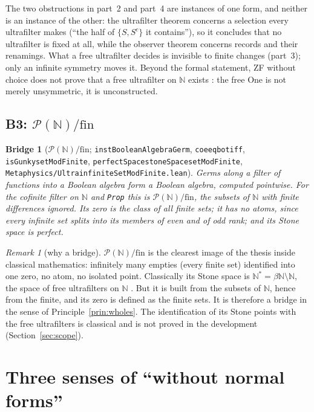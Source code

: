 \documentclass[]{article}
\newtheorem{bridge}[theorem]{Bridge}
\theoremstyle{definition}
\theoremstyle{remark}
\newtheorem{remark}[theorem]{Remark}
\newcommand{\codeus}{\textunderscore\allowbreak}
\newcommand{\code}[1]{\texttt{\let\_\codeus #1}}
\newcommand{\lpath}[1]{{\ttfamily\nolinkurl{#1}}}
\newcommand{\N}{\mathbb{N}}
\newcommand{\Nstar}{\N^{*}}
\newcommand{\Pfin}{\mathcal{P}(\N)/\mathrm{fin}}
\newcommand{\meta}[1]{\lpath{Metaphysics/#1.lean}}
\begin{document}
The two obstructions in part~2 and part~4 are instances of one form, and neither is an instance of
the other: the ultrafilter theorem concerns a selection every ultrafilter makes (``the half of
$\{S,S^{c}\}$ it contains''), so it concludes that no ultrafilter is fixed at all, while the observer
theorem concerns records and their renamings. What a free ultrafilter decides is invisible to finite
changes (part~3); only an infinite symmetry moves it. Beyond the formal statement, ZF without choice
does not prove that a free ultrafilter on $\N$ exists \cite{Feferman1965}: the free One is not
merely unsymmetric, it is unconstructed.

\subsection{\texorpdfstring{B3: $\Pfin$}{B3: P(N)/fin}}
\label{sec:pfin}

\begin{bridge}[$\Pfin$; \code{instBooleanAlgebraGerm}, \code{coe\_eq\_bot\_iff}, \code{isGunky\_setModFinite},
\code{perfectSpace\_stoneSpace\_setModFinite}, \meta{UltrainfiniteSetModFinite}]
\label{thm:pfin}
Germs along a filter of functions into a Boolean algebra form a Boolean algebra, computed pointwise.
For the cofinite filter on $\N$ and \code{Prop} this is $\Pfin$, the subsets of $\N$ with finite
differences ignored. Its zero is the class of all finite sets; it has no atoms, since every infinite
set splits into its members of even and of odd rank; and its Stone space is perfect.
\end{bridge}

\begin{remark}[why a bridge]
\label{rem:pfin-bridge}
$\Pfin$ is the clearest image of the thesis inside classical mathematics: infinitely many empties
(every finite set) identified into one zero, no atom, no isolated point. Classically its Stone space
is $\Nstar=\beta\N\setminus\N$, the space of free ultrafilters on $\N$
\cite{ComfortNegrepontis1974, vanMill1984}. But it is built from the subsets of $\N$, hence from the
finite, and its zero is defined as the finite sets. It is therefore a bridge in the sense of
Principle~\ref{prin:wholes}. The identification of its Stone points with the free ultrafilters is
classical and is not proved in the development (Section~\ref{sec:scope}).
\end{remark}

\section{Three senses of ``without normal forms''}
\label{sec:normal}
\end{document}
